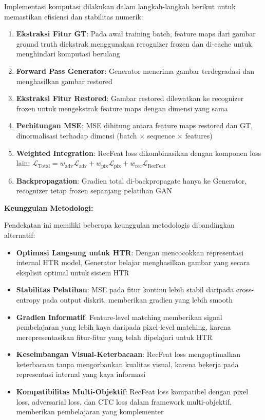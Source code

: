 \documentclass[12pt,a4paper]{article}
\begin{document}
Implementasi komputasi dilakukan dalam langkah-langkah berikut untuk memastikan efisiensi dan stabilitas numerik:

\begin{enumerate}[leftmargin=*, nosep]
\item \textbf{Ekstraksi Fitur GT}: Pada awal training batch, feature maps dari gambar ground truth diekstrak menggunakan recognizer frozen dan di-cache untuk menghindari komputasi berulang
\item \textbf{Forward Pass Generator}: Generator menerima gambar terdegradasi dan menghasilkan gambar restored
\item \textbf{Ekstraksi Fitur Restored}: Gambar restored dilewatkan ke recognizer frozen untuk mengekstrak feature maps dengan dimensi yang sama
\item \textbf{Perhitungan MSE}: MSE dihitung antara feature maps restored dan GT, dinormalisasi terhadap dimensi (batch × sequence × features)
\item \textbf{Weighted Integration}: RecFeat loss dikombinasikan dengan komponen loss lain: $\mathcal{L}_{\text{Total}} = w_{\text{adv}} \mathcal{L}_{\text{adv}} + w_{\text{pix}} \mathcal{L}_{\text{pix}} + w_{\text{rec}} \mathcal{L}_{\text{RecFeat}}$
\item \textbf{Backpropagation}: Gradien total di-backpropagate hanya ke Generator, recognizer tetap frozen sepanjang pelatihan GAN
\end{enumerate}

\textbf{Keunggulan Metodologi:}

Pendekatan ini memiliki beberapa keunggulan metodologis dibandingkan alternatif:

\begin{itemize}[leftmargin=*, nosep]
\item \textbf{Optimasi Langsung untuk HTR}: Dengan mencocokkan representasi internal HTR model, Generator belajar menghasilkan gambar yang secara eksplisit optimal untuk sistem HTR
\item \textbf{Stabilitas Pelatihan}: MSE pada fitur kontinu lebih stabil daripada cross-entropy pada output diskrit, memberikan gradien yang lebih smooth
\item \textbf{Gradien Informatif}: Feature-level matching memberikan signal pembelajaran yang lebih kaya daripada pixel-level matching, karena merepresentasikan fitur-fitur yang telah dipelajari untuk HTR
\item \textbf{Keseimbangan Visual-Keterbacaan}: RecFeat loss mengoptimalkan keterbacaan tanpa mengorbankan kualitas visual, karena bekerja pada representasi internal yang kaya informasi
\item \textbf{Kompatibilitas Multi-Objektif}: RecFeat loss kompatibel dengan pixel loss, adversarial loss, dan CTC loss dalam framework multi-objektif, memberikan pembelajaran yang komplementer
\end{itemize}
\end{document}
